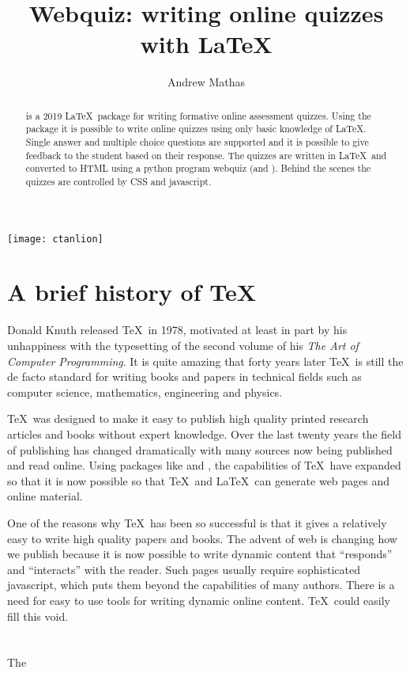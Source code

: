 \documentclass{ltugboat}
\author{Andrew Mathas}
\title{Webquiz: writing online quizzes with \LaTeX}
\begin{document}
\maketitle
\texttt{[image: ctanlion]}

\begin{abstract}
 \WebQuiz is a 2019 \LaTeX\ package for writing formative online
 assessment quizzes. Using the package it is possible to write online
 quizzes using only basic knowledge of \LaTeX. Single answer and
 multiple choice questions are supported and it is possible to give
 feedback to the student based on their response.  The quizzes are
 written in \LaTeX\ and converted to HTML using a python program
 \textsf{webquiz} (and ). Behind the scenes the quizzes
 are controlled by CSS and javascript.
\end{abstract}

\section{A brief history of \TeX}
Donald Knuth released \TeX\ in 1978, motivated at least in part by his
unhappiness with the typesetting of the second volume of his \textit{The
Art of Computer Programming}. It is quite amazing that forty years later
\TeX\  is still the de facto standard for writing books and papers in
technical fields such as computer science, mathematics, engineering and
physics.

\TeX\ was designed to make it easy to publish high quality printed
research articles and books without expert knowledge.  Over the last
twenty years the field of publishing has changed dramatically with many
sources now being published and read online.  Using packages like
 and , the capabilities of \TeX\ have expanded
so that it is now possible so that \TeX\ and \LaTeX\ can generate web
pages and online material.

One of the reasons why \TeX\ has been so successful is that it gives a
relatively easy to write high quality papers and books. The advent of
web is changing how we publish because it is now possible to write
dynamic content that ``responds'' and ``interacts'' with the reader.
Such pages usually require sophisticated javascript, which puts them
beyond the capabilities of many authors. There is a need for easy to use
tools for writing dynamic online content.  \TeX\ could easily fill this
void.

\section{\WebQuiz}
The \WebQuiz
\end{document}
